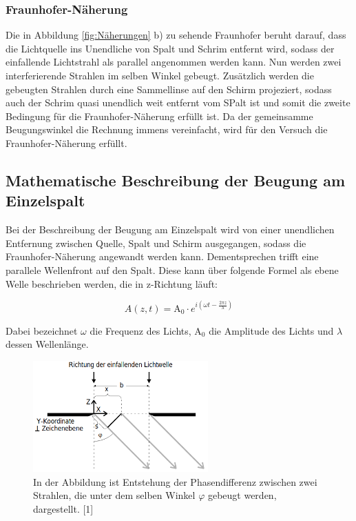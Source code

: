 \documentclass[titlepage = firstcover]{scrartcl}
\begin{document}
            \subsubsection*{Fraunhofer-Näherung}
                Die in Abbildung \ref{fig:Näherungen} b) zu sehende Fraunhofer beruht darauf, dass die Lichtquelle ins Unendliche von Spalt und Schrim entfernt wird, sodass der einfallende 
                Lichtstrahl als parallel angenommen werden kann. Nun werden zwei interferierende Strahlen im selben Winkel gebeugt. Zusätzlich werden die gebeugten Strahlen durch eine 
                Sammellinse auf den Schirm projeziert, sodass auch der Schrim quasi unendlich weit entfernt vom SPalt ist und somit die zweite Bedingung für die Fraunhofer-Näherung erfüllt ist.
                Da der gemeinsamme Beugungswinkel die Rechnung immens vereinfacht, wird für den Versuch die Fraunhofer-Näherung erfüllt.
                
    
        \subsection{Mathematische Beschreibung der Beugung am Einzelspalt}
            Bei der Beschreibung der Beugung am Einzelspalt wird von einer unendlichen Entfernung zwischen Quelle, Spalt und Schirm ausgegangen, sodass die Fraunhofer-Näherung angewandt werden kann.
            Dementsprechen trifft eine parallele Wellenfront auf den Spalt. Diese kann über folgende Formel als ebene Welle beschrieben werden, die in z-Richtung läuft:

            \begin{equation*}
                A(z,t) = \text{A}_0 \cdot e^{i\left(\omega t - \frac{2\pi z}{\lambda}\right)}
            \end{equation*}

            \noindent
            Dabei bezeichnet $\omega$ die Frequenz des Lichts, $\text{A}_0$ die Amplitude des Lichts und $\lambda$ dessen Wellenlänge. \newline
            
            \FloatBarrier

            \begin{figure}[h]
              \centering
              \includegraphics[width = 0.6\textwidth]{Bilder/Phasendifferenz.png}
              \caption{In der Abbildung ist Entstehung der Phasendifferenz zwischen zwei Strahlen, die unter dem selben Winkel $\varphi$ gebeugt werden, dargestellt. [1]}
              \label{fig:Phasendifferenz}
            \end{figure}
\end{document}
